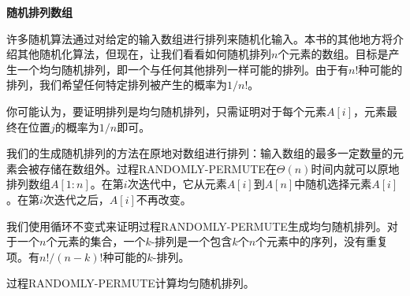 \documentclass[lang=cn,newtx,10pt,scheme=chinese]{elegantbook}
\begin{document}
\textbf{随机排列数组}

许多随机算法通过对给定的输入数组进行排列来随机化输入。本书的其他地方将介绍其他随机化算法，但现在，让我们看看如何随机排列$n$个元素的数组。目标是产生一个均匀随机排列，即一个与任何其他排列一样可能的排列。由于有$n$!种可能的排列，我们希望任何特定排列被产生的概率为$1/n!$。

你可能认为，要证明排列是均匀随机排列，只需证明对于每个元素$A[i]$，元素最终在位置$j$的概率为$1/n$即可。

我们的生成随机排列的方法在原地对数组进行排列：输入数组的最多一定数量的元素会被存储在数组外。过程RANDOMLY-PERMUTE在$\Theta(n)$时间内就可以原地排列数组$A[1:n]$。在第$i$次迭代中，它从元素$A[i]$到$A[n]$中随机选择元素$A[i]$。在第$i$次迭代之后，$A[i]$不再改变。

我们使用循环不变式来证明过程RANDOMLY-PERMUTE生成均匀随机排列。对于一个$n$个元素的集合，一个$k$-排列是一个包含$k$个$n$个元素中的序列，没有重复项。有$n!/(n-k)$!种可能的$k$-排列。

\begin{lemma}{}{}
过程RANDOMLY-PERMUTE计算均匀随机排列。
\end{lemma}
\end{document}
